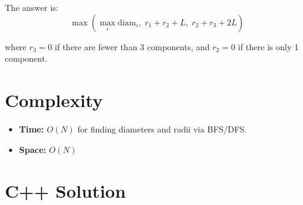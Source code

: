 \documentclass[11pt,a4paper]{article}
\begin{document}
The answer is:
\[
\max\left(\max_i \text{diam}_i,\; r_1 + r_2 + L,\; r_2 + r_3 + 2L\right)
\]

where $r_3 = 0$ if there are fewer than 3 components, and $r_2 = 0$ if there is only 1 component.

\section{Complexity}
\begin{itemize}
    \item \textbf{Time:} $O(N)$ for finding diameters and radii via BFS/DFS.
    \item \textbf{Space:} $O(N)$
\end{itemize}

\section{C++ Solution}
\end{document}
